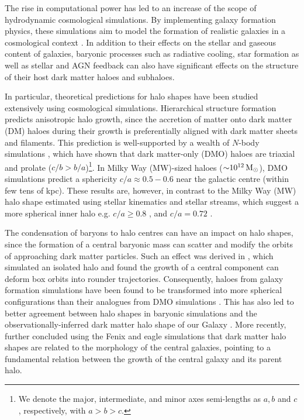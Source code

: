 \documentclass[fleqn,usenatbib]{mnras}
\def\msun{\,\rm M_{\odot}}
\begin{document}
The rise in computational power has led to an increase of the scope of hydrodynamic cosmological simulations. 
By implementing galaxy formation physics, these simulations aim to model the formation of realistic galaxies in a cosmological context \citep[for a review, see][]{Vogelsberger20v2}.
In addition to their effects on the stellar and gaseous content of galaxies,
baryonic processes such as radiative cooling, star formation as well as stellar and AGN feedback can also have significant effects on the structure of their host dark matter haloes and subhaloes.

In particular, theoretical predictions for halo shapes have been studied extensively using cosmological simulations.
Hierarchical structure formation predicts anisotropic halo growth, since the accretion of matter onto dark matter (DM) haloes during their growth is preferentially aligned with dark matter sheets and filaments.
This prediction is well-supported by a wealth of $N$-body simulations \citep[e.g.][]{Dubinski91v378,Warren92v399,Bullock2002,Jing02v574,Bailin05v627,Allgood06v367,Maccio08v391,Vera-Ciro2011}, which have shown that dark matter-only (DMO) haloes are triaxial and prolate ($c/b > b/a$)\footnote{We denote the major, intermediate, and minor axes semi-lengths as $a,b$ and $c$, respectively, with $a>b>c$.}.
In Milky Way (MW)-sized haloes (${\sim} 10^{12} \msun$), DMO simulations predict a sphericity $c/a \approx 0.5-0.6$ near the galactic centre (within few tens of kpc).
These results are, however, in contrast to the Milky Way (MW) halo shape estimated using stellar kinematics and stellar streams, which suggest a more spherical inner halo e.g. $c/a \ge 0.8$ \citep{Ibata01v551}, and $c/a = 0.72$ \citep{Law10v714}.

The condensation of baryons to halo centres can have an impact on halo shapes, since the formation of a central baryonic mass can scatter and modify the orbits of approaching dark matter particles.
Such an effect was derived in \cite{Debattista08v681}, which simulated an isolated halo and found the growth of a central component can deform box orbits into rounder trajectories.
Consequently, haloes from galaxy formation simulations have been found to be transformed into more spherical configurations than their analogues from DMO simulations \citep[e.g.][]{Katz91v377,Katz93v412,Dubinski94v431,Tissera10v406,Abadi10v407,Kazantzidis10v720,Bryan13v429,Butsky16v462,Chisari2017,Chua19v484}.
This has also led to better agreement between halo shapes in baryonic simulations and the observationally-inferred dark matter halo shape  of our Galaxy \citep[e.g.][]{Chua19v484, Prada19v490}.
More recently, \cite{Cataldi21v501} further concluded using the Fenix and {\sc eagle} simulations that dark matter halo shapes are related to the morphology of the central galaxies, pointing to a fundamental relation between the growth of the central galaxy and its parent halo.
\end{document}
